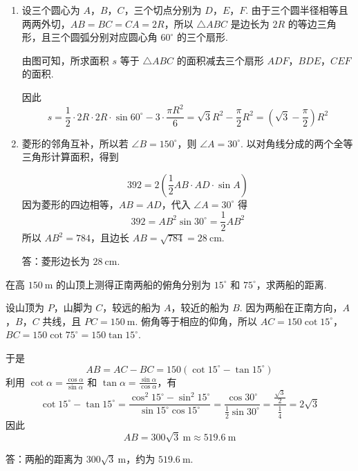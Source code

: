 \begin{solution}
\begin{enumerate}
\item 设三个圆心为 \(A\)，\(B\)，\(C\)，三个切点分别为 \(D\)，\(E\)，\(F\). 由于三个圆半径相等且两两外切，\(AB=BC=CA=2R\)，所以 \(\triangle ABC\) 是边长为 \(2R\) 的等边三角形，且三个圆弧分别对应圆心角 \(60^\circ\) 的三个扇形.

由图可知，所求面积 \(s\) 等于 \(\triangle ABC\) 的面积减去三个扇形 \(ADF\)，\(BDE\)，\(CEF\) 的面积.


因此
\[
s=\frac{1}{2}\cdot 2R\cdot 2R\cdot\sin 60^\circ-3\cdot\frac{\pi R^2}{6}
=\sqrt{3}R^2-\frac{\pi}{2}R^2
=\left(\sqrt{3}-\frac{\pi}{2}\right)R^2
\]

\item 菱形的邻角互补，所以若 \(\angle B=150^\circ\)，则 \(\angle A=30^\circ\). 以对角线分成的两个全等三角形计算面积，得到


\[
392=2\left(\frac{1}{2}AB\cdot AD\cdot\sin A\right)
\]
因为菱形的四边相等，\(AB=AD\)，代入 \(\angle A=30^\circ\) 得
\[
392=AB^2\sin 30^\circ=\frac{1}{2}AB^2
\]
所以 \(AB^2=784\)，且边长 \(AB=\sqrt{784}=28\mathrm{~cm}\).

答：菱形边长为 \(28\mathrm{~cm}\).
\end{enumerate}
\end{solution}

\begin{problem}
在高 \(150\mathrm{~m}\) 的山顶上测得正南两船的俯角分别为 \(15^\circ\) 和 \(75^\circ\)，求两船的距离.
\end{problem}

\begin{solution}
设山顶为 \(P\)，山脚为 \(C\)，较远的船为 \(A\)，较近的船为 \(B\). 因为两船在正南方向，\(A\)，\(B\)，\(C\) 共线，且 \(PC=150\mathrm{~m}\). 俯角等于相应的仰角，所以
\(AC=150\cot 15^\circ\)，\(BC=150\cot 75^\circ=150\tan 15^\circ\).


于是
\[
AB=AC-BC=150\left(\cot 15^\circ-\tan 15^\circ\right)
\]
利用 \(\cot\alpha=\frac{\cos\alpha}{\sin\alpha}\) 和 \(\tan\alpha=\frac{\sin\alpha}{\cos\alpha}\)，有
\[
\cot 15^\circ-\tan 15^\circ
=\frac{\cos^2 15^\circ-\sin^2 15^\circ}{\sin 15^\circ\cos 15^\circ}
=\frac{\cos 30^\circ}{\frac{1}{2}\sin 30^\circ}
=\frac{\frac{\sqrt{3}}{2}}{\frac{1}{4}}
=2\sqrt{3}
\]
因此
\[
AB=300\sqrt{3}\mathrm{~m}\approx 519.6\mathrm{~m}
\]

答：两船的距离为 \(300\sqrt{3}\mathrm{~m}\)，约为 \(519.6\mathrm{~m}\).
\end{solution}

